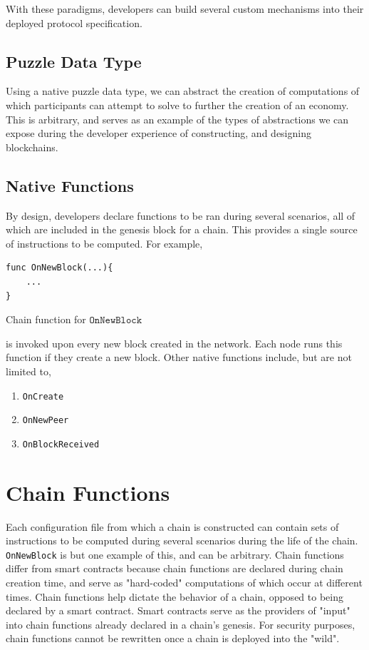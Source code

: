 \documentclass[12pt, titlepage, twocolumn]{report}
\begin{document}
With these paradigms, developers can build several custom mechanisms into their deployed protocol specification.


\subsection{Puzzle Data Type}
Using a native puzzle data type, we can abstract the creation of computations of which participants can attempt to solve to further the creation of an economy. This is arbitrary, and serves as an example of the types of abstractions we can expose during the developer experience of constructing, and designing blockchains.


\subsection{Native Functions}

By design, developers declare functions to be ran during several scenarios, all of which are included in the genesis block for a chain. This provides a single source of instructions to be computed. For example,

\begin{listing}[ht]
\begin{minipage}{\linewidth}
\begin{lstlisting}
func OnNewBlock(...){
	...
}
\end{lstlisting}
\end{minipage}
\caption{Chain function for \(\texttt{OnNewBlock}\)}
\label{code:8}
\end{listing}

is invoked upon every new block created in the network. Each node runs this function if they create a new block. Other native functions include, but are not limited to,

\begin{enumerate}
	\item \texttt{OnCreate}
	\item \texttt{OnNewPeer}
	\item \texttt{OnBlockReceived}
\end{enumerate}

\section{Chain Functions}
Each configuration file from which a chain is constructed can contain sets of instructions to be computed during several scenarios during the life of the chain. \texttt{OnNewBlock} is but one example of this, and can be arbitrary. Chain functions differ from smart contracts because chain functions are declared during chain creation time, and serve as "hard-coded" computations of which occur at different times. Chain functions help dictate the behavior of a chain, opposed to being declared by a smart contract. Smart contracts serve as the providers of "input" into chain functions already declared in a chain's genesis. For security purposes, chain functions cannot be rewritten once a chain is deployed into the "wild".
\end{document}
